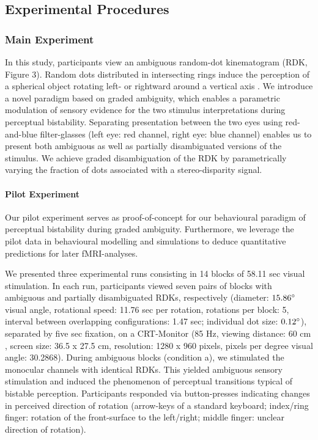 \documentclass[12pt]{article}
\begin{document}
\subsection{Experimental Procedures}

\subsubsection{Main Experiment}

In this study, participants view an ambiguous random-dot kinematogram (RDK, Figure 3). Random dots distributed in intersecting rings induce the perception of a spherical object rotating left- or rightward around a vertical axis \parencite{Pastukhov2012a}.  We introduce a novel paradigm based on graded ambiguity, which enables a parametric modulation of sensory evidence for the two stimulus interpretations during perceptual bistability. Separating presentation between the two eyes using red-and-blue filter-glasses (left eye: red channel, right eye: blue channel) enables us to present both ambiguous as well as partially disambiguated versions of the stimulus. We achieve graded disambiguation of the RDK by parametrically varying the fraction of dots associated with a stereo-disparity signal. 

\paragraph{Pilot Experiment}

Our pilot experiment serves as proof-of-concept for our behavioural paradigm of perceptual bistability during graded ambiguity. Furthermore, we leverage the pilot data in behavioural modelling and simulations to deduce quantitative predictions for later fMRI-analyses. 

We presented three experimental runs consisting in 14 blocks of 58.11 sec visual stimulation. In each run, participants viewed seven pairs of blocks with ambiguous and partially disambiguated RDKs, respectively (diameter: $15.86\degree$ visual angle, rotational speed: 11.76 sec per rotation, rotations per block: 5, interval between overlapping configurations: 1.47 sec; individual dot size: $0.12\degree$), separated by five sec fixation, on a CRT-Monitor (85 Hz, viewing distance: 60 cm , screen size: 36.5 x 27.5 cm, resolution: 1280 x 960 pixels, pixels per degree visual angle: 30.2868). During ambiguous blocks (condition a), we stimulated the monocular channels with identical RDKs. This yielded ambiguous sensory stimulation and induced the phenomenon of perceptual transitions typical of bistable perception. Participants responded via button-presses indicating changes in perceived direction of rotation (arrow-keys of a standard keyboard; index/ring finger: rotation of the front-surface to the left/right; middle finger: unclear direction of rotation).
\end{document}
